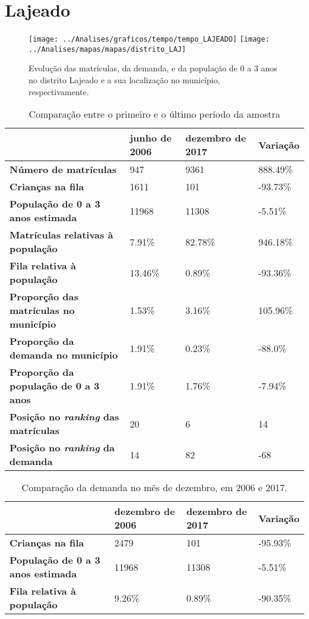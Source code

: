 \section{Lajeado}
\begin{figure}[H]
\centering
\texttt{[image: ../Analises/graficos/tempo/tempo\_LAJEADO]}
\texttt{[image: ../Analises/mapas/mapas/distrito\_LAJ]}
\caption{Evolução das matrículas, da demanda, e da população de 0 a 3 anos no distrito Lajeado e a sua localização no município, respectivamente.}
\end{figure}
\begin{table}[H]
\begin{tabular}{l|l|l|l}
\textbf{}                                      & \textbf{junho de 2006}       & \textbf{dezembro de 2017}    & \textbf{Variação} \\ \hline
\textbf{Número de matrículas}                  & 947 & 9361 & 888.49\% \\ \hline
\textbf{Crianças na fila}                      & 1611 & 101 & -93.73\% \\ \hline
\textbf{População de 0 a 3 anos estimada}      & 11968 & 11308 & -5.51\% \\ \hline
\textbf{Matrículas relativas à população}      & 7.91\% & 82.78\% & 946.18\% \\ \hline
\textbf{Fila relativa à população}             & 13.46\% & 0.89\% & -93.36\% \\ \hline
\textbf{Proporção das matrículas no município} & 1.53\% & 3.16\% & 105.96\% \\ \hline
\textbf{Proporção da demanda no município}     & 1.91\% & 0.23\% & -88.0\% \\ \hline
\textbf{Proporção da população de 0 a 3 anos}  & 1.91\% & 1.76\% & -7.94\% \\ \hline
\textbf{Posição no \textit{ranking} das matrículas}     & 20 & 6 & 14 \\ \hline
\textbf{Posição no \textit{ranking} da demanda}         & 14 & 82 & -68 \\ 
\end{tabular}
\caption{Comparação entre o primeiro e o último período da amostra}
\end{table}
\begin{table}[H]
\begin{tabular}{l|l|l|l}
\textbf{}                                 & \textbf{dezembro de 2006} & \textbf{dezembro de 2017} & \textbf{Variação} \\ \hline
\textbf{Crianças na fila}                      & 2479 & 101 & -95.93\% \\ \hline
\textbf{População de 0 a 3 anos estimada}      & 11968 & 11308 & -5.51\% \\ \hline
\textbf{Fila relativa à população}             & 9.26\% & 0.89\% & -90.35\% \\
\end{tabular}
\caption{Comparação da demanda no mês de dezembro, em 2006 e 2017.}
\end{table}
